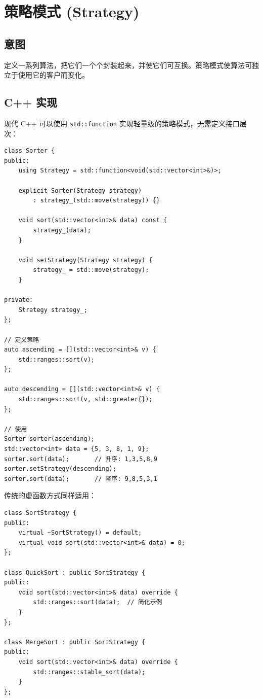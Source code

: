 \documentclass[12pt,a4paper,fontset=fandol]{ctexbook}
\begin{document}
\chapter{策略模式 (Strategy)}

\section{意图}

定义一系列算法，把它们一个个封装起来，并使它们可互换。策略模式使算法可独立于使用它的客户而变化。

\section{C++ 实现}

现代 C++ 可以使用 \texttt{std::function} 实现轻量级的策略模式，无需定义接口层次：

\begin{lstlisting}[style=cppstyle, caption={策略模式 --- std::function 方式}]
class Sorter {
public:
    using Strategy = std::function<void(std::vector<int>&)>;

    explicit Sorter(Strategy strategy)
        : strategy_(std::move(strategy)) {}

    void sort(std::vector<int>& data) const {
        strategy_(data);
    }

    void setStrategy(Strategy strategy) {
        strategy_ = std::move(strategy);
    }

private:
    Strategy strategy_;
};

// 定义策略
auto ascending = [](std::vector<int>& v) {
    std::ranges::sort(v);
};

auto descending = [](std::vector<int>& v) {
    std::ranges::sort(v, std::greater{});
};

// 使用
Sorter sorter(ascending);
std::vector<int> data = {5, 3, 8, 1, 9};
sorter.sort(data);       // 升序: 1,3,5,8,9
sorter.setStrategy(descending);
sorter.sort(data);       // 降序: 9,8,5,3,1
\end{lstlisting}

传统的虚函数方式同样适用：

\begin{lstlisting}[style=cppstyle, caption={策略模式 --- 传统虚函数方式}]
class SortStrategy {
public:
    virtual ~SortStrategy() = default;
    virtual void sort(std::vector<int>& data) = 0;
};

class QuickSort : public SortStrategy {
public:
    void sort(std::vector<int>& data) override {
        std::ranges::sort(data);  // 简化示例
    }
};

class MergeSort : public SortStrategy {
public:
    void sort(std::vector<int>& data) override {
        std::ranges::stable_sort(data);
    }
};
\end{lstlisting}
\end{document}

